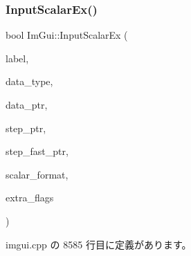 \subsubsection{\texorpdfstring{Input\+Scalar\+Ex()}{InputScalarEx()}}
{\footnotesize\ttfamily bool Im\+Gui\+::\+Input\+Scalar\+Ex (\begin{DoxyParamCaption}\item[{const char $\ast$}]{label,  }\item[{\mbox{\hyperlink{imgui__internal_8h_a22f27475affc8d8a1f2407887e5e1d19}{Im\+Gui\+Data\+Type}}}]{data\+\_\+type,  }\item[{void $\ast$}]{data\+\_\+ptr,  }\item[{void $\ast$}]{step\+\_\+ptr,  }\item[{void $\ast$}]{step\+\_\+fast\+\_\+ptr,  }\item[{const char $\ast$}]{scalar\+\_\+format,  }\item[{\mbox{\hyperlink{imgui_8h_a7d2c6153a6b9b5d3178ce82434ac9fb8}{Im\+Gui\+Input\+Text\+Flags}}}]{extra\+\_\+flags }\end{DoxyParamCaption})}



 imgui.\+cpp の 8585 行目に定義があります。

